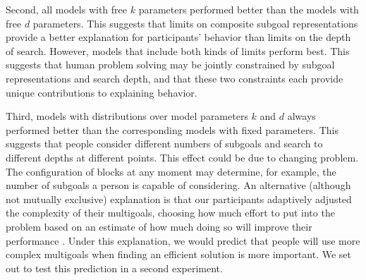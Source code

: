 \documentclass[10pt,letterpaper]{article}
\begin{document}
Second, all models with free $k$ parameters performed better than the models with free $d$ parameters. This suggests that limits on composite subgoal representations provide a better explanation for participants' behavior than limits on the depth of search. However, models that include both kinds of limits perform best. This suggests that human problem solving may be jointly constrained by subgoal representations and search depth, and that these two constraints each provide unique contributions to explaining behavior.

Third, models with distributions over model parameters $k$ and $d$ always performed better than the corresponding models with fixed parameters. This suggests that people consider different numbers of subgoals and search to different depths at different points. This effect could be due to changing problem. The configuration of blocks at any moment may determine, for example, the number of subgoals a person is capable of considering. An alternative (although not mutually exclusive) explanation is that our participants adaptively adjusted the complexity of their multigoals, choosing how much effort to put into the problem based on an estimate of how much doing so will improve their performance \citep{Shenhav2017,lieder2017strategy}.
Under this explanation, we would predict that people will use more complex multigoals when finding an efficient solution is more important. We set out to test this prediction in a second experiment.




\end{document}
